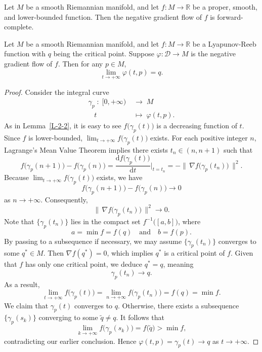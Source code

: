 \documentclass[10pt,a4paper]{amsart}
\begin{document}
\begin{lemma}\label{L-2-2}
Let $M$ be a smooth Riemannian manifold, and let $f:M\to\mathbb R$ be a proper, smooth, and lower-bounded function. Then the negative gradient flow of $f$ is forward-complete.
\end{lemma}

\begin{theorem}\label{T-2-3}
Let $M$ be a smooth Riemannian manifold, and let
$f: M\to\mathbb R$ be a Lyapunov-Reeb function with $q$ being the critical point. Suppose $\varphi:\mathcal D\to M$ is the negative gradient flow of $f$. Then for any $p\in M$,
\[
\lim_{t\to+\infty}\varphi(t,p)=q.
\]
\end{theorem}

\begin{proof}
Consider the integral curve
\[
\begin{aligned}
\gamma_p\;:\;[0,+\infty)\;&\longrightarrow\; M\\
\;\;\;t\quad\;&\longmapsto\;\varphi(t,p).
\end{aligned}
\]
As in Lemma~\ref{L-2-2}, it is easy to see  $f\big(\gamma_p(t)\big)$ is a decreasing function of $t$. Since $f$ is lower-bounded,   $\lim_{t\to+\infty}f\big(\gamma_p(t)\big)$ exists. For each positive integer $n$, Lagrange's Mean Value Theorem implies there exists $t_n\in(n,n+1)$ such that
\[
f\big(\gamma_p(n+1)\big)-f\big(\gamma_p(n)\big)
=\frac{\mathrm{d}f\big(\gamma_p(t)\big)}{\mathrm{d}t}\bigg|_{t=t_n}
=-\|\, \nabla f\big(\gamma_p(t_n)\big)\,\|^2.
\]
Because $\lim_{t\to+\infty}f\big(\gamma_p(t)\big)$ exists, we have
\[
f\big(\gamma_p(n+1)\big)-f\big(\gamma_p(n)\big)\to 0
\]
as $n\to+\infty$. Consequently,
\[
\|\,\nabla f\big(\gamma_p(t_n)\big)\,\|^2\to 0.
\]
Note that $\big\{\gamma_p(t_n)\big\}$ lies in the compact set $f^{-1}\big([a,b]\big)$,
where
\[
a=\min f=f(q)\quad\text{and}\quad b=f(p).
\]
By passing to a subsequence if necessary, we may assume $\big\{\gamma_p(t_n)\big\}$ converges to some $q^\ast\in M$. Then $\nabla f (q^\ast)=0$, which implies $q^\ast$ is a critical point of $f$. Given that $f$ has only one critical point, we deduce $q^\ast=q$, meaning
\[
\gamma_p(t_n)\to q.
\]
As a result,
\[
\lim_{t\to+\infty}f\big(\gamma_p(t)\big)
=\lim_{n\to+\infty}f\big(\gamma_p(t_n)\big)=f(q)=\min f.
\]
We claim that $\gamma_{p}(t)$ converges to $q$. Otherwise, there exists a subsequence $\big\{\gamma_{p}(s_k)\big\}$ converging to some $\tilde{q}\neq q$. It follows that
\[
\lim_{k\to+\infty}f\big(\gamma_p(s_k)\big)=f\big(\tilde{q}\big)>\min f,
\]
contradicting our earlier conclusion. Hence
$\varphi(t,p)=\gamma_p(t)\to q$ as $t\to+\infty$.
\end{proof}
\end{document}
